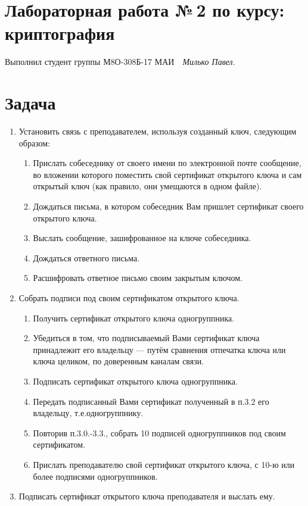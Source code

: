 \documentclass[12pt]{article}
\newcommand{\se}[1]{\section*{\bf #1}}
\begin{document}
\section*{\centering Лабораторная работа №\,2 по курсу:\\ криптография}

Выполнил студент группы М8О-308Б-17 МАИ \,\, \textit{Милько Павел}.

\se{Задача}

\begin{enumerate}
     пару OpenPGP-ключей, указав в сертификате свою почту. Создать её возможно, например, с помощью дополнения {\small Enigmail к почтовому клиенту thunderbird}, или из командной строки терминала ОС семейства linux.
    \item Установить связь с преподавателем, используя созданный ключ, следующим образом:
    \begin{enumerate}
        \item Прислать собеседнику от своего имени по электронной почте сообщение, во вложении которого поместить свой сертификат открытого ключа и сам открытый ключ (как правило, они умещаются в одном файле).
        \item Дождаться письма, в котором собеседник Вам пришлет сертификат своего открытого ключа.
        \item Выслать сообщение, зашифрованное на ключе собеседника.
        \item Дождаться ответного письма.
        \item Расшифровать ответное письмо своим закрытым ключом.
    \end{enumerate}
    \item Собрать подписи под своим сертификатом открытого ключа.
    \begin{enumerate}
        \item Получить сертификат открытого ключа одногруппника.
        \item Убедиться в том, что подписываемый Вами сертификат ключа принадлежит его владельцу --- путём сравнения отпечатка ключа или ключа целиком, по доверенным каналам связи.
        \item Подписать сертификат открытого ключа одногруппника.
        \item Передать подписанный Вами сертификат полученный в п.3.2 его владельцу, т.е.одногруппнику.
        \item Повторив п.3.0.-3.3., собрать 10 подписей одногруппников под своим сертификатом.
        \item Прислать преподавателю свой сертификат открытого ключа, с 10-ю или более подписями одногруппников.
    \end{enumerate}
\item Подписать сертификат открытого ключа преподавателя и выслать ему.
\end{enumerate}
\end{document}
